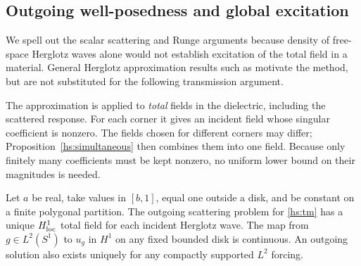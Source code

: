 \subsection{Outgoing well-posedness and global excitation}
\label{hs:global}

We spell out the scalar scattering and Runge arguments because density
of free-space Herglotz waves alone would not establish excitation of
the total field in a material.  General Herglotz approximation results
such as \cite{ochs1989} motivate the method, but are not substituted for
the following transmission argument.

The approximation is applied to \emph{total} fields in the dielectric,
including the scattered response.  For each corner it gives an incident
field whose singular coefficient is nonzero.  The fields chosen for
different corners may differ; Proposition~\ref{hs:simultaneous} then
combines them into one field.  Because only finitely many coefficients
must be kept nonzero, no uniform lower bound on their magnitudes is needed.

\begin{lemma}
\label{hs:wellposed}
Let $a$ be real, take values in $[b,1]$, equal one outside a disk, and
be constant on a finite polygonal partition.  The outgoing scattering
problem for \eqref{hs:tm} has a unique $H^1_{\rm loc}$ total field for
each incident Herglotz wave.  The map from $g\in L^2(S^1)$ to $u_g$ in
$H^1$ on any fixed bounded disk is continuous.  An outgoing solution
also exists uniquely for any compactly supported $L^2$ forcing.
\end{lemma}

